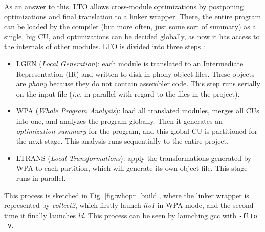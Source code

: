 \documentclass[runningheads]{llncs}
\begin{document}
As an answer to this, LTO allows cross-module optimizations by
postponing optimizations and final translation to a linker wrapper. There, the entire
program can be loaded by the compiler (but more often, just some sort of summary)
as a single, big CU, and optimizations can be decided globally,
as now it has access to the internals of other modules. LTO is divided into
three steps \cite{whoprgoogle,glek2010optimizing}:
\begin{itemize}
\item LGEN (\textit{Local Generation}): each module is translated to an Intermediate
Representation (IR) and written to disk in phony object files. These objects
are \emph{phony} because they do not contain assembler code. This step runs serially
on the input file (\textit{i.e.} in parallel with regard to the files in the project).

\item WPA (\textit{Whole Program Analysis}): load all translated modules, merges
all CUs into one, and analyzes the program globally.
Then it generates an \emph{optimization summary} for the program, and this global
CU is partitioned for the next stage. This analysis runs sequentially
to the entire project.

\item LTRANS (\textit{Local Transformations}): apply the transformations generated by
WPA to each partition, which will generate its own object file. This stage runs in
parallel.
\end{itemize}

This process is sketched in Fig. \ref{fig:whopr_build}, where the linker
wrapper is represented by \textit{collect2}, which firstly launch \textit{lto1}
in WPA mode, and the second time it finally launches \textit{ld}. This process
can be seen by launching gcc with \texttt{-flto -v}.
\end{document}
